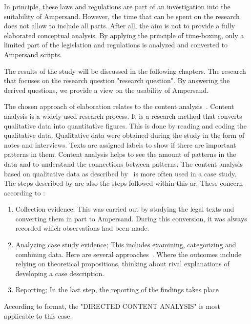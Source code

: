 In principle, these laws and regulations are part of an investigation into the suitability of Ampersand.
However, the time that can be spent on the research does not allow to include all parts.
After all, the aim is not to provide a fully elaborated conceptual analysis.
By applying the principle of time-boxing, only a limited part of the legislation and regulations is analyzed and converted to Ampersand scripts.

The results of the study will be discussed in the following chapters.
The research that focuses on the research question "\acrlong{research question}".
By answering the derived questions, we provide a view on the usability of Ampersand.

The chosen approach of elaboration relates to the content analysis~\citep{kohlbacher_use_2006}.
Content analysis is a widely used research process.
It is a research method that converts qualitative data into quantitative figures.
This is done by reading and coding the qualitative data.
Qualitative data were obtained during the study in the form of notes and interviews.
Texts are assigned labels to show if there are important patterns in them.
Content analysis helps to see the amount of patterns in the data and to understand the connections between patterns.
The content analysis based on qualitative data as described by~\cite{kohlbacher_use_2006} is more often used in a case study.
The steps described by \cite{kohlbacher_use_2006} are also the steps followed within this \acrshort{ar}.
These concern according to \cite{kohlbacher_use_2006}:
\begin{enumerate}
    \item Collection evidence;
    \newline This was carried out by studying the legal texts and converting them in part to Ampersand.
    During this conversion, it was always recorded which observations had been made.
    \item Analyzing case study evidence;
    \newline This includes examining, categorizing and combining data.
    Here are several approaches~\citep{hsieh_three_2005}.
    Where the outcomes include relying on theoretical propositions, thinking about rival explanations of developing a case description.
    \item Reporting;
    \newline In the last step, the reporting of the findings takes place
\end{enumerate}
According to \cite{hsieh_three_2005} format, the "DIRECTED CONTENT ANALYSIS" is most applicable to this case.
